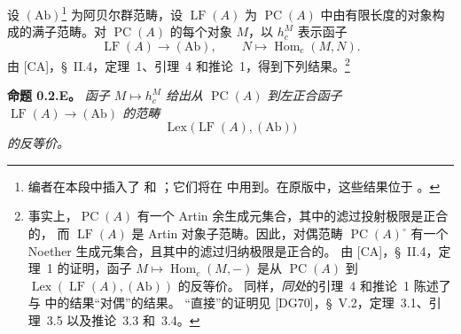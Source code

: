 
\medskip
设 \((\mathrm{Ab})\)\footnote{\label{sga3:VIIB:nde:10}编者在本段中插入了 和
；它们将在
 中用到。在原版中，这些结果位于
。} 为阿贝尔群范畴，设 \(\operatorname{LF}(A)\) 为
\(\operatorname{PC}(A)\) 中由有限长度的对象构成的满子范畴。对
\(\operatorname{PC}(A)\) 的每个对象 \(M\)，以 \(h_c^M\) 表示函子
\[
  \operatorname{LF}(A)\longrightarrow(\mathrm{Ab}),
  \qquad
  N\longmapsto\operatorname{Hom}_c(M,N).
\]
由 \textup{[CA]}，\S~II.4，定理~1、引理~4 和推论~1，得到下列结果。\footnote{\label{sga3:VIIB:nde:11}事实上，\(\operatorname{PC}(A)\) 有一个 Artin 余生成元集合，其中的滤过投射极限是正合的，
而 \(\operatorname{LF}(A)\) 是 Artin 对象子范畴。因此，对偶范畴
\(\operatorname{PC}(A)^\circ\) 有一个 Noether 生成元集合，且其中的滤过归纳极限是正合的。
由 \textup{[CA]}，\S~II.4，定理~1 的证明，函子
\(M\mapsto\operatorname{Hom}_c(M,-)\) 是从 \(\operatorname{PC}(A)\) 到
\(\operatorname{Lex}(\operatorname{LF}(A),(\mathrm{Ab}))\) 的反等价。
同样，\textit{同处}的引理~4 和推论~1 陈述了与
 中的结果“对偶”的结果。
“直接”的证明见 \textup{[DG70]}，\S~V.2，定理~3.1、引理~3.5 以及推论~3.3 和~3.4。}

\medskip
\noindent\textbf{命题 0.2.E。}
\label{sga3:VIIB:0.2.E}
\textit{函子 \(M\mapsto h_c^M\) 给出从 \(\operatorname{PC}(A)\) 到左正合函子
\(\operatorname{LF}(A)\longrightarrow(\mathrm{Ab})\) 的范畴}
\[
  \operatorname{Lex}\bigl(\operatorname{LF}(A),(\mathrm{Ab})\bigr)
\]
\textit{的反等价。}

